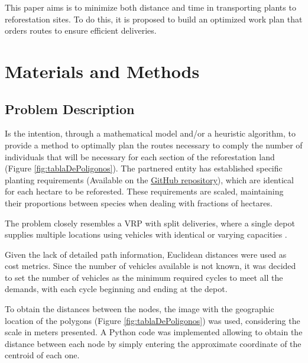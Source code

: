 \documentclass{amsart}
\begin{document}
        This paper aims is to minimize both distance and time in transporting plants to reforestation sites. To do this, it is proposed to build an optimized work plan that orders routes to ensure efficient deliveries.
        




\section{Materials and Methods}
    \subsection{Problem Description}
    Is the intention, through a mathematical model and/or a heuristic algorithm, to provide a method to optimally plan the routes necessary to comply the number of individuals that will be necessary for each section of the reforestation land (Figure \ref{fig:tablaDePoligonos}). The partnered entity has established specific planting requirements (Available on the \underline{\href{https://github.com/JuanjoBelt/VRP-ReforestationTransportLogistics}{GitHub repository}}), which are identical for each hectare to be reforested. These requirements are scaled, maintaining their proportions between species when dealing with fractions of hectares.
    
    The problem closely resembles a VRP with split deliveries, where a single depot supplies multiple locations using vehicles with identical or varying capacities \parencite{Dror}.
    
    Given the lack of detailed path information, Euclidean distances were used as cost metrics. Since the number of vehicles available is not known, it was decided to set the number of vehicles as the minimum required cycles to meet all the demands, with each cycle beginning and ending at the depot. 

    To obtain the distances between the nodes, the image with the geographic location of the polygons (Figure \ref{fig:tablaDePoligonos}) was used, considering the scale in meters presented. A Python code was implemented allowing to obtain the distance between each node by simply entering the approximate coordinate of the centroid of each one.
        
\end{document}
